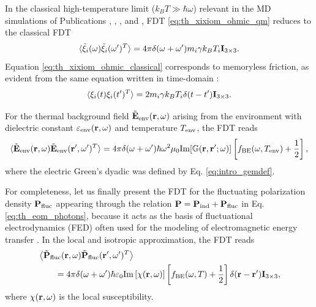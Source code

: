 In the classical high-temperature limit ($k_B T \gg \hbar \omega$) relevant in the MD simulations of Publications , , , and , FDT \eqref{eq:th_xixiom_ohmic_qm} reduces to the classical FDT
\begin{equation}
 \langle \tilde \xi_i(\omega) \tilde \xi_i(\omega')^T \rangle = 4\pi \delta(\omega+\omega') m_i \gamma k_B T_i  \mathbf{I}_{3\times 3}. \label{eq:th_xixiom_ohmic_classical}
\end{equation}
Equation \eqref{eq:th_xixiom_ohmic_classical} corresponds to memoryless friction, as evident from the same equation written in time-domain \cite{zwanzig}:
\begin{equation}
 \langle \xi_i(t)  \xi_i(t')^T \rangle = 2 m_i \gamma k_B T_i \delta(t-t') \mathbf{I}_{3\times 3}. \label{eq:th_xixit_ohmic_classical}
\end{equation}

For the thermal background field $\tilde{\mathbf{E}}_{\textrm{env}}(\mathbf{r},\omega)$ arising from the environment with dielectric constant $\varepsilon_{\textrm{env}}(\mathbf{r},\omega)$ and temperature $T_{\textrm{env}}$, the FDT reads \cite{novotny}
\begin{equation}
 \langle \tilde{\mathbf{E}}_{\textrm{env}}(\mathbf{r},\omega) \tilde{\mathbf{E}}_{\textrm{env}}(\mathbf{r}',\omega')^T \rangle = 4\pi \delta(\omega+\omega') \hbar \omega^2 \mu_0 \textrm{Im}[\mathbb{G}(\mathbf{r},\mathbf{r}';\omega)] \left[f_{\textrm{BE}}(\omega,T_{\textrm{env}})+ \frac{1}{2} \right], \label{eq:th_e0e0om}
\end{equation}
where the electric Green's dyadic was defined by Eq. \eqref{eq:intro_gemdef}. 

For completeness, let us finally present the FDT for the fluctuating polarization density $\mathbf{P}_{\textrm{fluc}}$ appearing through the relation $\mathbf{P}=\mathbf{P}_{\textrm{ind}}+\mathbf{P}_{\textrm{fluc}}$ in Eq. \eqref{eq:th_eom_photons}, because it acts as the basis of fluctuational electrodynamics \cite{rytov,lifshitz56} (FED) often used for the modeling of electromagnetic energy transfer \cite{joulain05,volokitin07}. In the local and isotropic approximation, the FDT reads \cite{novotny}
\begin{alignat}{2}
 & \left\langle \tilde{\mathbf{P}}_{\textrm{fluc}}(\mathbf{r},\omega) \tilde{\mathbf{P}}_{\textrm{fluc}}(\mathbf{r}',\omega')^T\right\rangle \notag \\
 &\qquad = 4\pi \delta(\omega+\omega') \hbar \varepsilon_0 \textrm{Im}\left[ \chi(\mathbf{r},\omega)\right] \left[f_{\textrm{BE}}(\omega,T)+\frac{1}{2}\right] \delta(\mathbf{r}-\mathbf{r}') \mathbf{I}_{3 \times 3}, \label{eq:th_PflucPfluc}
\end{alignat}
where $\chi(\mathbf{r},\omega)$ is the local susceptibility. 

